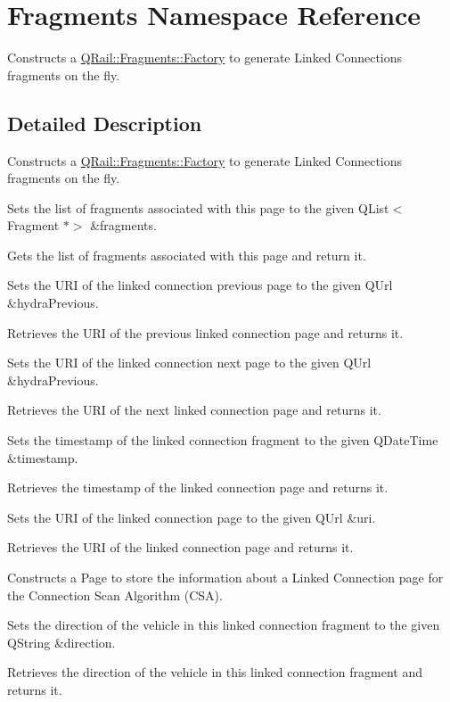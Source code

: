 \hypertarget{namespaceFragments}{}\section{Fragments Namespace Reference}
\label{namespaceFragments}


Constructs a \mbox{\hyperlink{classQRail_1_1Fragments_1_1Factory}{Q\+Rail\+::\+Fragments\+::\+Factory}} to generate Linked Connections fragments on the fly.  




\subsection{Detailed Description}
Constructs a \mbox{\hyperlink{classQRail_1_1Fragments_1_1Factory}{Q\+Rail\+::\+Fragments\+::\+Factory}} to generate Linked Connections fragments on the fly. 

Sets the list of fragments associated with this page to the given Q\+List$<$\+Fragment $\ast$$>$ \&fragments.

Gets the list of fragments associated with this page and return it.

Sets the U\+RI of the linked connection previous page to the given Q\+Url \&hydra\+Previous.

Retrieves the U\+RI of the previous linked connection page and returns it.

Sets the U\+RI of the linked connection next page to the given Q\+Url \&hydra\+Previous.

Retrieves the U\+RI of the next linked connection page and returns it.

Sets the timestamp of the linked connection fragment to the given Q\+Date\+Time \&timestamp.

Retrieves the timestamp of the linked connection page and returns it.

Sets the U\+RI of the linked connection page to the given Q\+Url \&uri.

Retrieves the U\+RI of the linked connection page and returns it.

Constructs a Page to store the information about a Linked Connection page for the Connection Scan Algorithm (C\+SA).

Sets the direction of the vehicle in this linked connection fragment to the given Q\+String \&direction.

Retrieves the direction of the vehicle in this linked connection fragment and returns it.

